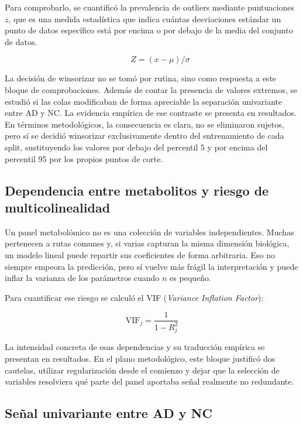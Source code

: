 Para comprobarlo, se cuantificó la prevalencia de outliers mediante puntuaciones $z$, que es una medida estadística que
indica cuántas desviaciones estándar un punto de datos específico está por encima o por debajo de la media del conjunto
de datos.

\begin{equation}
\qquad Z=(x-\mu)/\sigma
\end{equation}

La decisión de winsorizar no se tomó por rutina, sino como respuesta a este bloque de comprobaciones. Además de contar
la presencia de valores extremos, se estudió si las colas modificaban de forma apreciable la separación univariante entre
AD y NC. La evidencia empírica de ese contraste se presenta en resultados. En términos metodológicos, la consecuencia es
clara, no se eliminaron sujetos, pero sí se decidió winsorizar exclusivamente dentro del entrenamiento de cada split,
sustituyendo los valores por debajo del percentil 5 y por encima del percentil 95 por los propios puntos de corte.

\subsection{Dependencia entre metabolitos y riesgo de multicolinealidad}

Un panel metabolómico no es una colección de variables independientes. Muchas pertenecen a rutas comunes y, si varias
capturan la misma dimensión biológica, un modelo lineal puede repartir sus coeficientes de forma arbitraria. Eso no
siempre empeora la predicción, pero sí vuelve más frágil la interpretación y puede inflar la varianza de los
parámetros cuando $n$ es pequeño.

Para cuantificar ese riesgo se calculó el VIF (\textit{Variance Inflation Factor}):

\begin{equation}
\text{VIF}_j = \frac{1}{1 - R^2_j}
\end{equation}


La intensidad concreta de esas dependencias y su traducción empírica se presentan en resultados. En el plano
metodológico, este bloque justificó dos cautelas, utilizar regularización desde el comienzo y dejar que la selección de
variables resolviera qué parte del panel aportaba señal realmente no redundante.

\subsection{Señal univariante entre AD y NC}


